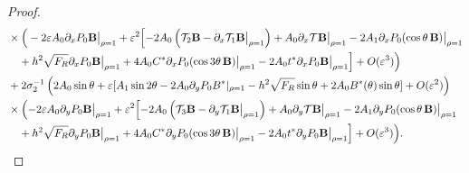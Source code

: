 \documentclass[12pt,reqno]{amsart}
\numberwithin{equation}{section}
\theoremstyle{definition}
\theoremstyle{remark}
\begin{document}
\begin{proof}
\begin{align*}
& \times\Big(-2\varepsilon A_0  \partial_xP_0  \textbf{B}\big|_{\rho=1}
+\varepsilon^2\Bigl[-2A_0 \left(\mathcal{T}_2  \textbf{B}-\partial_x  \mathcal{T}_1  \textbf{B}\big|_{\rho=1}\right)+A_0\partial_x\mathcal{T} \textbf{B}\big|_{\rho=1}-2A_1\partial_xP_0(  \cos\theta\, \textbf{B})\big|_{\rho=1}
\\
&\quad +h^2\sqrt{F_R}\partial_xP_0  \textbf{B}\big|_{\rho=1} +4A_0C^*\partial_xP_0(\cos3\theta\,  \textbf{B} )\big|_{\rho=1}-2A_0t^*\partial_xP_0  \textbf{B}\big|_{\rho=1}\Bigr]+O(\varepsilon^3)\Bigr) \\
& +2\sigma_2^{-1}
\left (2A_0\sin\theta+\varepsilon[ A_1\sin2\theta-2A_0\partial_yP_0B^*|_{\rho=1}
-h^2\sqrt{F_R}\sin\theta+2A_0B^*(\theta)\sin\theta]+O(\varepsilon^2)\right ) \\
& \times\Bigl(-2\varepsilon A_0   \partial_y P_0  \textbf{B}\big|_{\rho=1}
  +\varepsilon^2\Bigl[-2  A_0 \left(\mathcal{T}_3  \textbf{B}-\partial_y  \mathcal{T}_1  \textbf{B}\big|_{\rho=1}\right)+A_0\partial_y\mathcal{T}  \textbf{B}\big|_{\rho=1}-2A_1\partial_yP_0(  \cos\theta\, \textbf{B})\big|_{\rho=1}
\\
& \quad+h^2\sqrt{F_R}\partial_yP_0  \textbf{B}\big|_{\rho=1} +4A_0C^*\partial_yP_0(  \cos3\theta\, \textbf{B}  )\big|_{\rho=1}-2A_0t^*\partial_yP_0  \textbf{B}\big|_{\rho=1}\Bigr]+O(\varepsilon^3)\Bigr).
\end{align*}

\end{proof}
\end{document}
